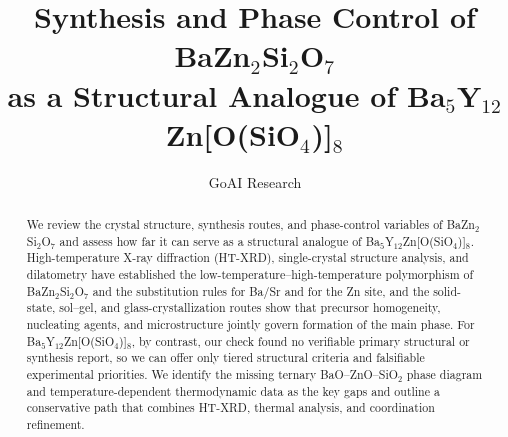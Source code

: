 \documentclass[10pt]{article}
\title{Synthesis and Phase Control of BaZn$_2$Si$_2$O$_7$\texorpdfstring{\\}{ }as a Structural Analogue of Ba$_5$Y$_{12}$Zn[O(SiO$_4$)]$_8$}
\author{GoAI Research}
\date{}
\begin{document}
\maketitle

\begin{abstract}
We review the crystal structure, synthesis routes, and phase-control variables of BaZn$_2$Si$_2$O$_7$ and assess how far it can serve as a structural analogue of Ba$_5$Y$_{12}$Zn[O(SiO$_4$)]$_8$. High-temperature X-ray diffraction (HT\nobreakdash-XRD), single-crystal structure analysis, and dilatometry have established the low-temperature--high-temperature polymorphism of BaZn$_2$Si$_2$O$_7$ and the substitution rules for Ba\slash Sr and for the Zn site, and the solid-state, sol--gel, and glass-crystallization routes show that precursor homogeneity, nucleating agents, and microstructure jointly govern formation of the main phase. For Ba$_5$Y$_{12}$Zn[O(SiO$_4$)]$_8$, by contrast, our check found no verifiable primary structural or synthesis report, so we can offer only tiered structural criteria and falsifiable experimental priorities. We identify the missing ternary BaO--ZnO--SiO$_2$ phase diagram and temperature-dependent thermodynamic data as the key gaps and outline a conservative path that combines HT\nobreakdash-XRD, thermal analysis, and coordination refinement.
\end{abstract}











\end{document}
